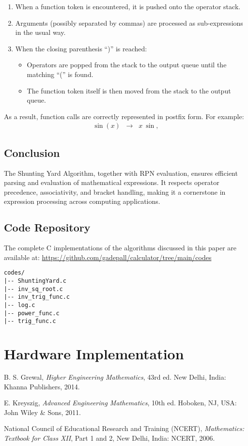 \documentclass[conference]{IEEEtran}
\begin{document}
\begin{enumerate}
    \item When a function token is encountered, it is pushed onto the operator stack.
    \item Arguments (possibly separated by commas) are processed as sub-expressions in the usual way.
    \item When the closing parenthesis ``)'' is reached:
    \begin{itemize}
        \item Operators are popped from the stack to the output queue until the matching ``('' is found.
        \item The function token itself is then moved from the stack to the output queue.
    \end{itemize}
\end{enumerate}

As a result, function calls are correctly represented in postfix form. For example:
\begin{align}
\sin(x) \;\;\rightarrow\;\; x \ \sin, 
\end{align}


\subsection{Conclusion}
The Shunting Yard Algorithm, together with RPN evaluation, ensures efficient parsing and evaluation of mathematical expressions. It respects operator precedence, associativity, and bracket handling, making it a cornerstone in expression processing across computing applications.

\subsection{Code Repository}
The complete C implementations of the algorithms discussed in this paper are available at: \url{https://github.com/gadepall/calculator/tree/main/codes}


\begin{lstlisting}[caption={Repository Structure in codes/}]
codes/
|-- ShuntingYard.c
|-- inv_sq_root.c
|-- inv_trig_func.c
|-- log.c
|-- power_func.c
|-- trig_func.c
\end{lstlisting}

\section{Hardware Implementation}

\begin{thebibliography}{00}

B. S. Grewal, \textit{Higher Engineering Mathematics}, 43rd ed. New Delhi, India: Khanna Publishers, 2014.

E. Kreyszig, \textit{Advanced Engineering Mathematics}, 10th ed. Hoboken, NJ, USA: John Wiley \& Sons, 2011.

National Council of Educational Research and Training (NCERT), 
\textit{Mathematics: Textbook for Class XII}, Part 1 and 2, New Delhi, India: NCERT, 2006.

\end{thebibliography}
\end{document}
